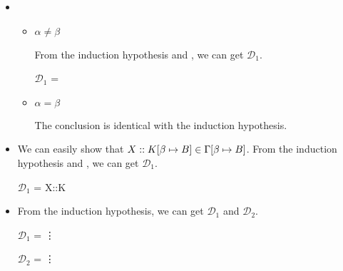 \begin{itemize}
\begin{itemize}
	      \end{itemize}
	      	      	      	      	      
	\item \WTW
	      	      	      	      	      
	      \begin{itemize}
	      		      		      		      		      	
	      	\item $\alpha \neq \beta$
	      	      	      	      	      	      	      	      	      	      
	      	      From the induction hypothesis and \WTW, we can get $\mathcal{D}_1$.
	      	      	      	      	      	      	      	      	      	      
	      	      $\mathcal{D}_1$ = 
	      	      {}
	      	      	      	      	      	      	      	      	      	      
	      	\item $\alpha = \beta$
	      	      	      	      	      	      	      	      	      	      
	      	      The conclusion is identical with the induction hypothesis.
	      	      	      	      	      	      	      	      	      	      
	      \end{itemize}
	      	      	      	      	      
	\item \KVar
	      	      	      	      	      
	      We can easily show that $X::K[\beta \mapsto B] \in \Gamma[\beta \mapsto B]$.
	      From the induction hypothesis and \KVar, we can get $\mathcal{D}_1$.
	      	      	      	      	      
	      $\mathcal{D}_1$ = 
	      {X::K\SB \in \GG \andalso {}}
	      	      	      	      	      
	\item \KAbs
	      	      	      	      	      
	      From the induction hypothesis, we can get $\mathcal{D}_1$ and $\mathcal{D}_2$.
	      	      	      	      	      
	      $\mathcal{D}_1$ = 
	      {\vdots}
	      	      	      	      	      
	      $\mathcal{D}_2$ = 
	      {\vdots}
	      	      	      	      	      

\end{itemize}
